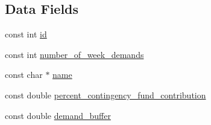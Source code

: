 \subsection*{Data Fields}
\begin{DoxyCompactItemize}
\item 
const int \mbox{\hyperlink{classUtility_ad41c4ea5c911c5000452a3371cd65d5f_ad41c4ea5c911c5000452a3371cd65d5f}{id}}
\item 
const int \mbox{\hyperlink{classUtility_a0548db3746582251082aa430db49dad0_a0548db3746582251082aa430db49dad0}{number\+\_\+of\+\_\+week\+\_\+demands}}
\item 
const char $\ast$ \mbox{\hyperlink{classUtility_ad0ce5c179a7f5ceb46d4fcae08dbfb47_ad0ce5c179a7f5ceb46d4fcae08dbfb47}{name}}
\item 
const double \mbox{\hyperlink{classUtility_a7b1a097ec188be8e7175d058b5e6596c_a7b1a097ec188be8e7175d058b5e6596c}{percent\+\_\+contingency\+\_\+fund\+\_\+contribution}}
\item 
const double \mbox{\hyperlink{classUtility_a4be9760339ec06e5c932890da8e566b3_a4be9760339ec06e5c932890da8e566b3}{demand\+\_\+buffer}}
\end{DoxyCompactItemize}

